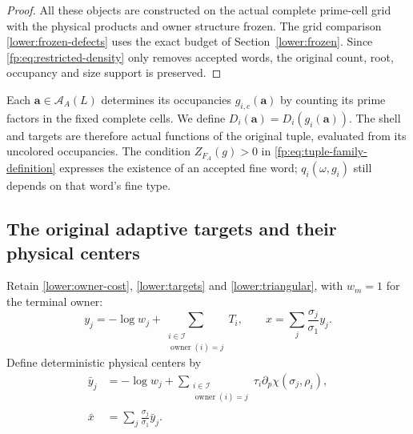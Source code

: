 \begin{proof}
All these objects are constructed on the actual complete prime-cell
grid with the physical products and owner structure frozen. The
grid comparison \eqref{lower:frozen-defects} uses the exact budget
of Section~\ref{lower:frozen}.
Since \eqref{fp:eq:restricted-density} only removes accepted words,
the original count, root, occupancy and size support is preserved.
\end{proof}

Each $\mathbf a\in\mathcal A_A(L)$ determines its occupancies
$g_{i,c}(\mathbf a)$ by counting its prime factors in the fixed
complete cells. We define $D_i(\mathbf a)=D_i(g_i(\mathbf a))$.
The shell and targets are therefore actual functions of the original
tuple, evaluated from its uncolored occupancies. The condition
$Z_{F_A}(g)>0$ in \eqref{fp:eq:tuple-family-definition} expresses
the existence of an accepted fine word; $q_i(\omega,g_i)$ still
depends on that word's fine type.

\subsection{The original adaptive targets and their physical centers}

Retain \eqref{lower:owner-cost}, \eqref{lower:targets} and
\eqref{lower:triangular}, with $w_m=1$ for the terminal owner:
\[
 y_j=-\log w_j+
       \sum_{\substack{i\in\mathcal I\\\operatorname{owner}(i)=j}}T_i,
 \qquad x=\sum_j\frac{\sigma_j}{\sigma_1}y_j.
\]
Define deterministic physical centers by
\begin{align}
 \bar y_j&=-\log w_j+
       \sum_{\substack{i\in\mathcal I\\\operatorname{owner}(i)=j}}
           \tau_i\partial_p\chi(\sigma_j,\rho_i),
           \label{fp:eq:ybar}\\
 \bar x&=\sum_j\frac{\sigma_j}{\sigma_1}\bar y_j.
           \label{fp:eq:xbar}
\end{align}

